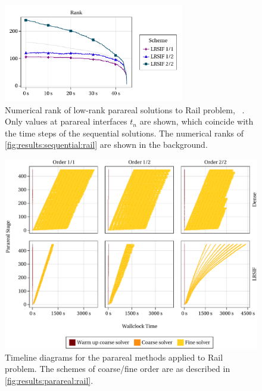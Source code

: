 \begin{figure}[tp]
  \centering
  \includegraphics[width=0.7\textwidth]{figures/fig_results_parareal_rank.pdf}
  \caption[Numerical rank of low-rank parareal solutions to Rail problem]{%
    Numerical rank of low-rank parareal solutions to Rail problem,
    \cf~\cite[Figure~6.6b]{Lang2017}.
    Only values at parareal interfaces $t_n$ are shown,
    which coincide with the time steps of the sequential solutions.
    The numerical ranks of \autoref{fig:results:sequential:rail} are shown in the background.
  }
  \label{fig:results:parareal:rank}
\end{figure}

\begin{figure}[tp]
  \includegraphics[width=\textwidth]{figures/fig_timeline_all.pdf}
  \caption[Timeline diagrams for parareal method applied to Rail problem]{%
    Timeline diagrams for the parareal methods applied to Rail problem.
    The schemes of coarse/fine order are as described in \autoref{fig:results:parareal:rail}.
  }
  \label{fig:results:parareal:timeline}
\end{figure}

